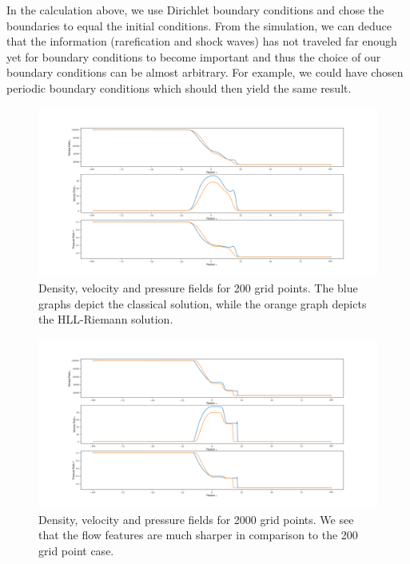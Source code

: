 \documentclass{scrartcl}
\begin{document}
In the calculation above, we use Dirichlet boundary conditions and chose the boundaries to equal the initial conditions. 
From the simulation, we can deduce that the information (rarefication and shock waves) has not traveled far enough yet for boundary conditions to become important and thus the choice of our boundary conditions can be almost arbitrary.
For example, we could have chosen periodic boundary conditions which should then yield the same result.

\newpage

\begin{figure}[H]
	\centering
	\includegraphics[width=1.0\linewidth]{../Adiabatic200}
	\caption{Density, velocity and pressure fields for 200 grid points. The blue graphs depict the classical solution, while the orange graph depicts the HLL-Riemann solution. }
	\label{fig:adiabatic200}
\end{figure}

\begin{figure}[H]
	\centering
	\includegraphics[width=1.0\linewidth]{../Adiabatic2000}
	\caption{Density, velocity and pressure fields for 2000 grid points. We see that the flow features are much sharper in comparison to the 200 grid point case.}
	\label{fig:adiabatic2000}
\end{figure}
\end{document}
